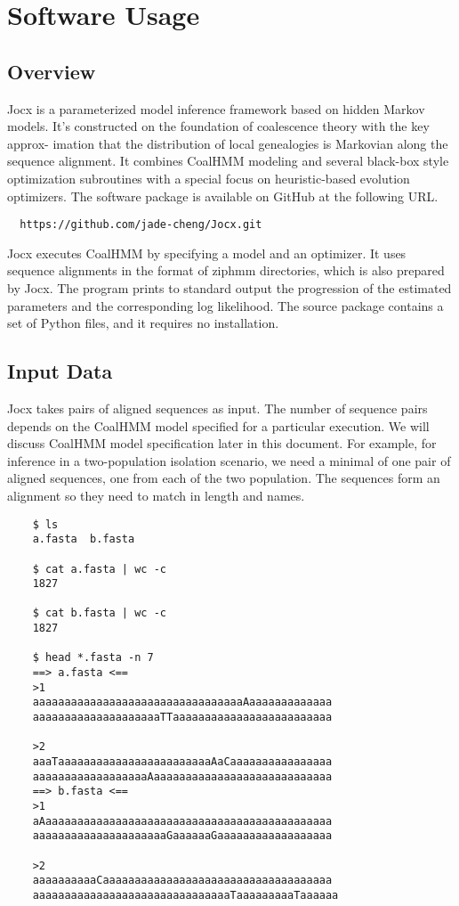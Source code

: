 \section{Software Usage}

\subsection{Overview}

Jocx is a parameterized model inference framework based on hidden Markov models.
It's constructed on the foundation of coalescence theory with the key approx-
imation that the distribution of local genealogies is Markovian along the
sequence alignment. It combines CoalHMM modeling and several black-box style
optimization subroutines with a special focus on heuristic-based evolution
optimizers. The software package is available on GitHub at the following URL.

{\small{}\begin{verbatim}
  https://github.com/jade-cheng/Jocx.git
\end{verbatim}}

Jocx executes CoalHMM by specifying a model and an optimizer. It uses sequence
alignments in the format of ziphmm directories, which is also prepared by Jocx.
The program prints to standard output the progression of the estimated
parameters and the corresponding log likelihood. The source package contains a
set of Python files, and it requires no installation.

\subsection{Input Data}

Jocx takes pairs of aligned sequences as input. The number of sequence pairs
depends on the CoalHMM model specified for a particular execution. We will
discuss CoalHMM model specification later in this document. For example, for
inference in a two-population isolation scenario, we need a minimal of one pair
of aligned sequences, one from each of the two population. The sequences form an
alignment so they need to match in length and names.

{\small{}\begin{verbatim}
    $ ls
    a.fasta  b.fasta

    $ cat a.fasta | wc -c
    1827

    $ cat b.fasta | wc -c
    1827

    $ head *.fasta -n 7
    ==> a.fasta <==
    >1
    aaaaaaaaaaaaaaaaaaaaaaaaaaaaaaaaaAaaaaaaaaaaaaa
    aaaaaaaaaaaaaaaaaaaaTTaaaaaaaaaaaaaaaaaaaaaaaaa

    >2
    aaaTaaaaaaaaaaaaaaaaaaaaaaaaAaCaaaaaaaaaaaaaaaa
    aaaaaaaaaaaaaaaaaaAaaaaaaaaaaaaaaaaaaaaaaaaaaaa
    ==> b.fasta <==
    >1
    aAaaaaaaaaaaaaaaaaaaaaaaaaaaaaaaaaaaaaaaaaaaaaa
    aaaaaaaaaaaaaaaaaaaaaGaaaaaaGaaaaaaaaaaaaaaaaaa

    >2
    aaaaaaaaaaCaaaaaaaaaaaaaaaaaaaaaaaaaaaaaaaaaaaa
    aaaaaaaaaaaaaaaaaaaaaaaaaaaaaaaTaaaaaaaaaTaaaaaa
\end{verbatim}}

